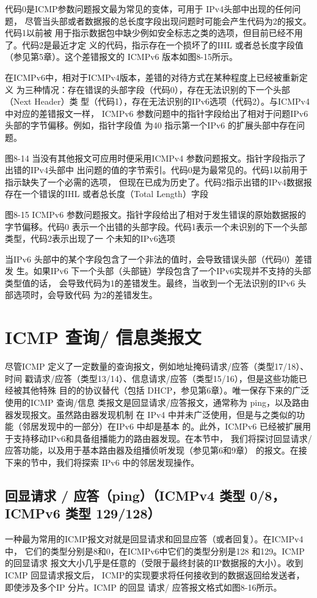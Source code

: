 代码0是ICMP参数问题报文最为常见的变体，可用于 IPv4头部中出现的任何问题，
尽管当头部或者数据报的总长度字段出现问题时可能会产生代码为2的报文。代码1以前被
用于指示数据包中缺少例如安全标志之类的选项，但目前已经不用了。代码2是最近才定
义的代码，指示存在一个损坏了的IHL 或者总长度字段值（参见第5章）。这个差错报文的
ICMPv6 版本如图8-15所示。

在ICMPv6中，相对于ICMPv4版本，差错的对待方式在某种程度上已经被重新定义
为三种情况：存在错误的头部字段（代码0），存在无法识别的下一个头部（Next Header）类
型（代码1），存在无法识别的IPv6选项（代码2）。与ICMPv4中对应的差错报文一样，
ICMPv6 参数问题中的指针字段给出了相对于问题IPv6 头部的字节偏移。例如，指针字段值
为40 指示第一个IPv6 的扩展头部中存在问题。

图8-14 当没有其他报文可应用时便采用ICMPv4 参数问题报文。指针字段指示了出错的IPv4头部中
出问题的值的字节索引。代码0是为最常见的。代码1以前用于指示缺失了一个必需的选项，
但现在已成为历史了。代码2指示出错的IPv4数据报存在一个错误的IHL 或者总长度（Total
Length）字段

图8-15 ICMPv6 参数问题报文。指针字段给出了相对于发生错误的原始数据报的字节偏移。代码0
表示一个出错的头部字段。代码1表示一个未识别的下一个头部类型，代码2表示出现了一
个未知的IPv6选项

当IPv6 头部中的某个字段包含了一个非法的值时，会导致错误头部（代码0）差错发
生。如果IPv6 下一个头部（头部链）学段包含了一个IPv6实现并不支持的头部类型值的话，
会导致代码为1的差错发生。最终，当收到一个无法识别的IPv6 头部选项时，会导致代码
为2的差错发生。

\section{ICMP 查询/ 信息类报文}

尽管ICMP 定义了一定数量的查询报文，例如地址掩码请求/应答（类型17/18）、时间
戳请求/应答（类型13/14）、信息请求/应答（类型15/16），但是这些功能已经被其他特殊
目的的协议替代（包括 DHCP，参见第6章）。唯一保存下来的广泛使用的ICMP 查询/信息
类报文是回显请求/应答报文，通常称为 ping，以及路由器发现报文。虽然路由器发现机制
在 IPv4 中并未广泛使用，但是与之类似的功能（邻居发现中的一部分）在IPv6 中却是基本
的。此外，ICMPv6 已经被扩展用于支持移动IPv6和具备组播能力的路由器发现。在本节中，
我们将探讨回显请求/ 应答功能，以及用于基本路由器及组播侦听发现（参见第6和9章）
的报文。在接下来的节中，我们将探索 IPv6 中的邻居发现操作。

\subsection{回显请求 / 应答（ping）（ICMPv4 类型 0/8，ICMPv6 类型 129/128）}
一种最为常用的ICMP报文对就是回显请求和回显应答（或者回复）。在ICMPv4 中，
它们的类型分别是8和0，在ICMPv6中它们的类型分别是128 和129。ICMP 的回显请求
报文大小几乎是任意的（受限于最终封装的IP数据报的大小）。收到ICMP 回显请求报文后，
ICMP的实现要求将任何接收到的数据返回给发送者，即使涉及多个IP 分片。ICMP 的回显
请求/ 应答报文格式如图8-16所示。

